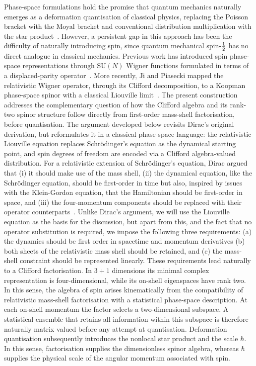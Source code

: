\documentclass[final,5p,times,twocolumn]{elsarticle}
\begin{document}
Phase-space formulations hold  the promise that quantum mechanics naturally emerges as a deformation quantisation of classical physics, replacing the Poisson bracket with the Moyal bracket and conventional distribution multiplication with the star product~\cite{GROENEWOLD1946405,Moyal_1949}. 
However, a persistent gap in this approach has been the difficulty of naturally introducing spin, since quantum mechanical spin-$1 \over 2$ has no direct analogue in classical mechanics. 
Previous work has introduced spin phase-space representations through $\mathrm{SU}(N)$ Wigner functions formulated in terms of a displaced-parity operator~\cite{PhysRevA.99.012115}.
More recently, Ji and Piasecki mapped the relativistic Wigner operator, through its Clifford decomposition, to a Koopman phase-space spinor with a classical Liouville limit~\cite{sym18061018}.
The present construction addresses the complementary question of how the Clifford algebra and its rank-two spinor structure follow directly from first-order mass-shell factorisation, before quantisation.
The argument developed below revisits Dirac's original derivation, but reformulates it in a classical phase-space language: 
the relativistic Liouville equation replaces Schr\"odinger's equation as the dynamical starting point, and spin degrees of freedom are encoded via a Clifford algebra-valued distribution. 
For a relativistic extension of Schr\"odinger's equation, Dirac argued that 
(i) it should make use of the mass shell, 
(ii) the dynamical equation, like the Schr\"odinger equation, should be first-order in time but also, inspired by issues with the Klein-Gordon equation, that the Hamiltonian should be first-order in space, and 
(iii) the four-momentum components should be replaced with their operator counterparts~\cite{Dirac28}. 
Unlike Dirac's argument, we will use the Liouville equation as the basis for the discussion, but apart from this, and the fact that no operator substitution is required, we impose the following three requirements: 
(a) the dynamics should be first order in spacetime and momentum derivatives 
(b) both sheets of the relativistic mass shell should be retained, and 
(c) the mass-shell constraint should be represented linearly. 
These requirements lead naturally to a Clifford factorisation. 
In $3+1$ dimensions its minimal complex representation is four-dimensional, while its on-shell eigenspaces have rank two.
In this sense, the algebra of spin arises kinematically from the compatibility of relativistic mass-shell factorisation with a statistical phase-space description.
At each on-shell momentum the factor selects a two-dimensional subspace. 
A statistical ensemble that retains all information within this subspace is therefore naturally matrix valued before any attempt at quantisation.
Deformation quantisation subsequently introduces the nonlocal star product and the scale $\hbar$. 
In this sense, factorisation supplies the dimensionless spinor algebra, whereas $\hbar$ supplies the physical scale of the angular momentum associated with spin.
\end{document}
